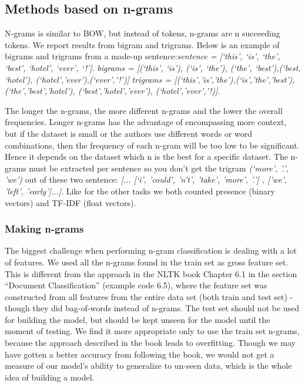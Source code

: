 \documentclass{article}
\begin{document}
\subsection{Methods based on n-grams}
N-grams is similar to BOW, but instead of tokens, n-grams are n succeeding tokens. We report results from bigram and trigrams. Below is an example of bigrams and trigrams from a made-up sentence:\textit{sentence = [`this', `is', `the', `best', `hotel', `ever', `!']}. \textit{bigrams = [(`this', `is'), (`is', `the'), (`the', `best'),(`best, `hotel'), (`hotel','ever'),(`ever','!')]} \textit{trigrams = [(`this','is','the'),(`is','the','best'), (`the','best','hotel'), (`best','hotel','ever'), (`hotel','ever','!)].}

The longer the n-grams, the more different n-grams and the lower the overall frequencies. Longer n-grams has the advantage of encompassing more context, but if the dataset is small or the authors use different words or word combinations, then the frequency of each n-gram will be too low to be significant. Hence it depends on the dataset which n is the best for a specific dataset. The n-grams must be extracted per sentence so you don't get the trigram \textit{(`more', '.', 'we')} out of these two sentence: \textit{[... [`i', 'could', 'n't', 'take', 'more', '.'] , ['we', 'left', 'early']...]}. Like for the other tasks we both counted presence (binary vectors) and TF-IDF (float vectors). 

\subsubsection{Making n-grams}
The biggest challenge when performing n-gram classification is dealing with a lot of features. 
We used all the n-grams found in the train set as gross feature set. This is different from the approach in the NLTK book Chapter 6.1 in the section “Document Classification” (example code 6.5), where the feature set was constructed from all features from the entire data set (both train and test set) - though they did bag-of-words instead of n-grams. The test set should not be used for building the model, but should be kept unseen for the model until the moment of testing. We find it more appropriate only to use the train set n-grams, because the approach described in the book leads to overfitting. Though we may have gotten a better accuracy from following the book, we would not get a measure of our model’s ability to generalize to un-seen data, which is the whole idea of building a model. 
\end{document}
